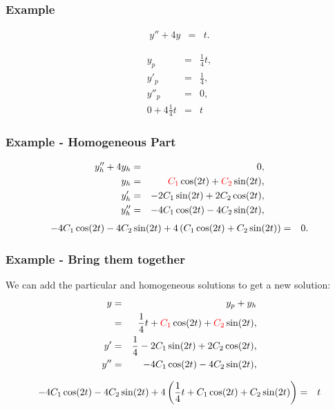\begin{frame}
  \frametitle{Example}

  \begin{eqnarray*}
    y'' + 4y & = & t.
  \end{eqnarray*}

  \begin{eqnarray*}
    y_p & = & \frac{1}{4} t, \\
    y'_p & = & \frac{1}{4}, \\
    y''_p & = & 0, \\
    0 + 4\frac{1}{4} t & = & t
  \end{eqnarray*}
\end{frame}

\begin{frame}
  \frametitle{Example - Homogeneous Part}

  \begin{eqnarray*}
    y''_h + 4y_h & = & 0, \\
    y_h & = & {\color{red}C_1} \cos(2t) + {\color{red}C_2} \sin(2t), \\
    y'_h & = & -2 C_1 \sin(2t) + 2 C_2 \cos(2t), \\
    y''_h & = & -4 C_1 \cos(2t) - 4 C_2 \sin(2t),
  \end{eqnarray*}
  \begin{eqnarray*}
    -4 C_1 \cos(2t) - 4 C_2 \sin(2t) + 4\left( C_1 \cos(2t) + C_2 \sin(2t) \right) & = & 0.
  \end{eqnarray*}

\end{frame}


\begin{frame}
  \frametitle{Example - Bring them together}

  We can add the particular and homogeneous solutions to get a new solution:
  \begin{eqnarray*}
    y & = & y_p + y_h \\
    & = & \frac{1}{4} t + {\color{red}C_1} \cos(2t) + {\color{red}C_2} \sin(2t), \\
    y' & = & \frac{1}{4} - 2 C_1 \sin(2t) + 2 C_2 \cos(2t), \\
    y'' & = & - 4 C_1 \cos(2t) - 4 C_2 \sin(2t),
  \end{eqnarray*}

  \begin{eqnarray*}
    - 4 C_1 \cos(2t) - 4 C_2 \sin(2t) + 4 \left( \frac{1}{4} t + C_1 \cos(2t) + C_2 \sin(2t) \right) & = & t
  \end{eqnarray*}

\end{frame}


